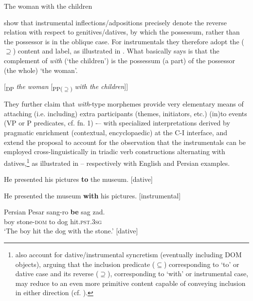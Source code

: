 \documentclass[output=paper,modfonts,nonflat,newtxmath,colorlinks,citecolor=brown]{langsci/langscibook}
\begin{document}
\ea%
    \label{ex:franco:4}
    The woman with the children
    \z

\citet{FrancoManzini2017Ins} show that instrumental inflections/adpositions precisely denote the reverse relation with respect to genitives/datives, by which the possessum, rather than the possessor is in the oblique case. For instrumentals they therefore adopt the (${\supseteq}$) content and label, as illustrated in . What  basically says is that the complement of \textit{with} (‘the children’) is the possessum (a part) of the possessor (the whole) ‘the woman’.

\ea%
    \label{ex:franco:5}
     {[}\textsubscript{DP} \textit{the woman} [\textsubscript{PP(${\supseteq}$)} \textit{with the children}]{]}

    \z


They further claim that \textit{with}{}-type morphemes provide very elementary means of attaching (i.e. including) extra participants (themes, initiators, etc.) (in)to events (VP or \liv P predicates, cf. fn. 1) -– with specialized interpretations derived by pragmatic enrichment (contextual, encyclopaedic) at the C-I interface, and extend the proposal to account for the observation that the instrumentals can be employed cross-linguistically in triadic verb constructions alternating with datives,\footnote{\citet{FrancoManzini2017Ins} also account for dative/instrumental syncretism (eventually including DOM objects), arguing that the inclusion predicate (\textrm{${\subseteq}$}) corresponding to ‘to’ or dative case and its reverse (\textrm{${\supseteq}$}), corresponding to ‘with’ or instrumental case, may reduce to an even more primitive content capable of conveying inclusion in either direction (cf. ).}  as illustrated in -- respectively with English and Persian examples.

\ea%
    \label{ex:franco:6}
    \ea \label{ex:franco:6a}
    He presented his pictures \textbf{to} the museum. \hfill[dative]

     \ex \label{ex:franco:6b}
    He presented the museum \textbf{with} his pictures. \hfill[instrumental]
    \z
    \z


\ea Persian%
    \label{ex:franco:7}
    \ea  \label{ex:franco:7a}
    \gll  Pesar sang-ro \textbf{be} sag zad.  \\
         boy stone-\textsc{dom} to dog hit.\textsc{pst.3sg} \\
    \glt ‘The boy hit the dog with the stone.’ \hfill [dative]
\end{document}
